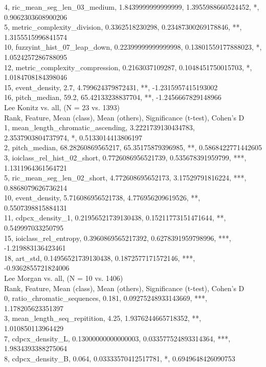 4, ric_mean_seg_len_03_medium, 1.8439999999999999, 1.3955988660524452, *, 0.9062303608900206\\
5, metric_complexity_division, 0.3362518230298, 0.23487300269178846, **, 1.3155515996841574\\
10, fuzzyint_hist_07_leap_down, 0.22399999999999998, 0.13801559177888023, *, 1.0524257286788095\\
12, metric_complexity_compression, 0.2163037109287, 0.1048451750015703, *, 1.0184708184398046\\
15, event_density, 2.7, 4.799624379872431, **, -1.2315957415193002\\
16, pitch_median, 59.2, 65.42133238837704, **, -1.2456667829148966\\
Lee Konitz vs. all, (N = 23 vs. 1393)\\
Rank, Feature, Mean (class), Mean (others), Significance (t-test), Cohen's D\\
1, mean_length_chromatic_ascending, 3.2221739130434783, 2.3537903804737974, *, 0.5133014413806197\\
2, pitch_median, 68.28260869565217, 65.35175879396985, **, 0.5868422771442605\\
3, ioiclass_rel_hist_02_short, 0.7726086956521739, 0.535678391959799, ***, 1.1311964361564721\\
5, ric_mean_seg_len_02_short, 4.772608695652173, 3.17529791816224, ***, 0.8868079626736214\\
10, event_density, 5.716086956521738, 4.776956209619526, **, 0.5507398815884131\\
11, cdpcx_density_1, 0.21956521739130438, 0.15211773151471644, **, 0.549997033250795\\
15, ioiclass_rel_entropy, 0.3960869565217392, 0.6278391959798996, ***, -1.219883136423461\\
18, art_std, 0.14956521739130438, 0.1872577171572146, ***, -0.9362855721824006\\
Lee Morgan vs. all, (N = 10 vs. 1406)\\
Rank, Feature, Mean (class), Mean (others), Significance (t-test), Cohen's D\\
0, ratio_chromatic_sequences, 0.181, 0.09275248933143669, ***, 1.178205623351397\\
3, mean_length_seq_repitition, 4.25, 1.9376244665718352, **, 1.010850113964429\\
7, cdpcx_density_L, 0.13000000000000003, 0.033577524893314364, ***, 1.9834393388275064\\
8, cdpcx_density_B, 0.064, 0.03333570412517781, *, 0.6949648426090753\\
